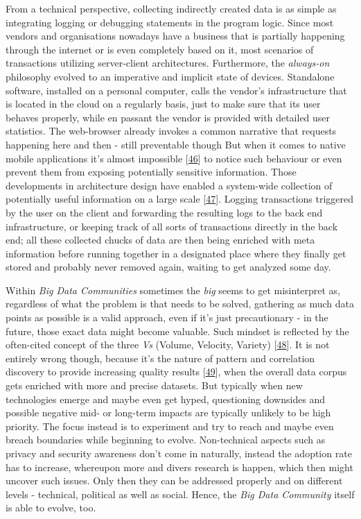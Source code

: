 \documentclass[12pt,english,a4paper,titlepage,cleardoublepage=empty,dottedtoc]{report}
\begin{document}
From a technical perspective, collecting indirectly created data is as
simple as integrating logging or debugging statements in the program
logic. Since most vendors and organisations nowadays have a business
that is partially happening through the internet or is even completely
based on it, most scenarios of transactions utilizing server-client
architectures. Furthermore, the \emph{always-on} philosophy evolved to
an imperative and implicit state of devices. Standalone software,
installed on a personal computer, calls the vendor's infrastructure that
is located in the cloud on a regularly basis, just to make sure that its
user behaves properly, while en passant the vendor is provided with
detailed user statistics. The web-browser already invokes a common
narrative that requests happening here and then - still preventable
though But when it comes to native mobile applications it's almost
impossible {[}\protect\hyperlink{ref-web_2016_answers-io}{46}{]} to
notice such behaviour or even prevent them from exposing potentially
sensitive information. Those developments in architecture design have
enabled a system-wide collection of potentially useful information on a
large scale
{[}\protect\hyperlink{ref-web_2016_big-data-enthusiasts-should-not-ignore}{47}{]}.
Logging transactions triggered by the user on the client and forwarding
the resulting logs to the back end infrastructure, or keeping track of
all sorts of transactions directly in the back end; all these collected
chucks of data are then being enriched with meta information before
running together in a designated place where they finally get stored and
probably never removed again, waiting to get analyzed some day.

Within \emph{Big Data Communities} sometimes the \emph{big} seems to get
misinterpret as, regardless of what the problem is that needs to be
solved, gathering as much data points as possible is a valid approach,
even if it's just precautionary - in the future, those exact data might
become valuable. Such mindset is reflected by the often-cited concept of
the three \emph{Vs} (Volume, Velocity, Variety)
{[}\protect\hyperlink{ref-report_2001_3d-data-management-controlling-data-volume-velocity-and-variety}{48}{]}.
It is not entirely wrong though, because it's the nature of pattern and
correlation discovery to provide increasing quality results
{[}\protect\hyperlink{ref-paper_2015_big-data-for-development-a-review-of-promises-and-challenges:more-data}{49}{]},
when the overall data corpus gets enriched with more and precise
datasets. But typically when new technologies emerge and maybe even get
hyped, questioning downsides and possible negative mid- or long-term
impacts are typically unlikely to be high priority. The focus instead is
to experiment and try to reach and maybe even breach boundaries while
beginning to evolve. Non-technical aspects such as privacy and security
awareness don't come in naturally, instead the adoption rate has to
increase, whereupon more and divers research is happen, which then might
uncover such issues. Only then they can be addressed properly and on
different levels - technical, political as well as social. Hence, the
\emph{Big Data Community} itself is able to evolve, too.
\end{document}
